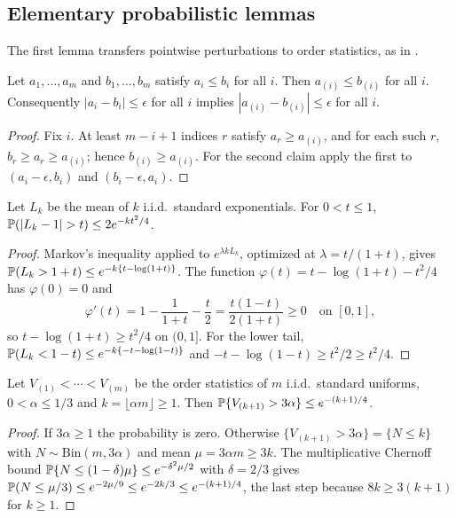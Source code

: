 \subsection{Elementary probabilistic lemmas}\label{app:elementary}

The first lemma transfers pointwise perturbations to order statistics, as
in \citet[Appendix, Lemma~3]{gardesPodgorny2025}.

\begin{lemma}\label{lem:app-sorting}
Let $a_1,\ldots,a_m$ and $b_1,\ldots,b_m$ satisfy $a_i\le b_i$ for all $i$.
Then $a_{(i)}\le b_{(i)}$ for all $i$.  Consequently
$|a_i-b_i|\le\epsilon$ for all $i$ implies
$|a_{(i)}-b_{(i)}|\le\epsilon$ for all $i$.
\end{lemma}

\begin{proof}
Fix $i$.  At least $m-i+1$ indices $r$ satisfy $a_r\ge a_{(i)}$, and for
each such $r$, $b_r\ge a_r\ge a_{(i)}$; hence $b_{(i)}\ge a_{(i)}$.  For
the second claim apply the first to $(a_i-\epsilon,b_i)$ and
$(b_i-\epsilon,a_i)$.
\end{proof}

\begin{lemma}\label{lem:app-chernoff}
Let $L_k$ be the mean of $k$ i.i.d.\ standard exponentials.  For
$0<t\le1$,
$\Pp(|L_k-1|>t)\le2e^{-kt^2/4}$.
\end{lemma}

\begin{proof}
Markov's inequality applied to $e^{\lambda kL_k}$, optimized at
$\lambda=t/(1+t)$, gives
$\mathbb P(L_k>1+t)\le e^{-k\{t-\log(1+t)\}}$.  The function
$\varphi(t)=t-\log(1+t)-t^2/4$ has $\varphi(0)=0$ and
\[
 \varphi'(t)=1-\frac1{1+t}-\frac t2=\frac{t(1-t)}{2(1+t)}\ge0
 \quad\text{on }[0,1],
\]
so $t-\log(1+t)\ge t^2/4$ on $(0,1]$.  For the lower tail,
$\mathbb P(L_k<1-t)\le e^{-k\{-t-\log(1-t)\}}$ and
$-t-\log(1-t)\ge t^2/2\ge t^2/4$.
\end{proof}

\begin{lemma}\label{lem:app-threshold}
Let $V_{(1)}<\cdots<V_{(m)}$ be the order statistics of $m$ i.i.d.\
standard uniforms, $0<\alpha\le1/3$ and
$k=\lfloor\alpha m\rfloor\ge1$.  Then
$\mathbb P\{V_{(k+1)}>3\alpha\}\le e^{-(k+1)/4}$.
\end{lemma}

\begin{proof}
If $3\alpha\ge1$ the probability is zero.  Otherwise
$\{V_{(k+1)}>3\alpha\}=\{N\le k\}$ with
$N\sim\mathrm{Bin}(m,3\alpha)$ and mean $\mu=3\alpha m\ge3k$.  The
multiplicative Chernoff bound
$\mathbb P\{N\le(1-\delta)\mu\}\le e^{-\delta^2\mu/2}$
\citep[Section~2.2]{boucheronLugosiMassart2013} with $\delta=2/3$ gives
$\mathbb P(N\le\mu/3)\le e^{-2\mu/9}\le e^{-2k/3}\le e^{-(k+1)/4}$, the last
step because $8k\ge3(k+1)$ for $k\ge1$.
\end{proof}

